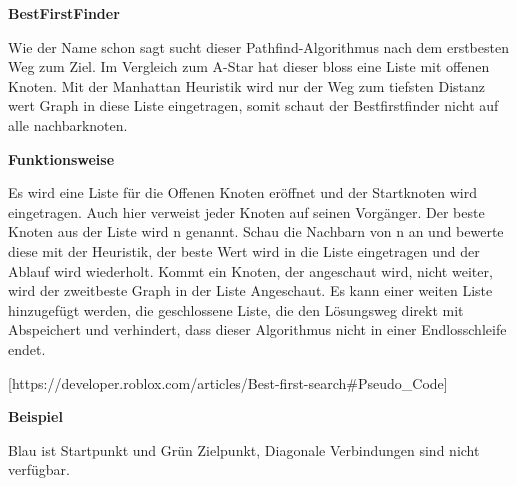 \textbf{BestFirstFinder}

Wie der Name schon sagt sucht dieser Pathfind-Algorithmus nach dem
erstbesten Weg zum Ziel. Im Vergleich zum A-Star hat dieser bloss eine
Liste mit offenen Knoten. Mit der Manhattan Heuristik wird nur der Weg
zum tiefsten Distanz wert Graph in diese Liste eingetragen, somit schaut
der Bestfirstfinder nicht auf alle nachbarknoten.

\textbf{Funktionsweise}

Es wird eine Liste für die Offenen Knoten eröffnet und der Startknoten
wird eingetragen. Auch hier verweist jeder Knoten auf seinen Vorgänger.
Der beste Knoten aus der Liste wird n genannt. Schau die Nachbarn von n
an und bewerte diese mit der Heuristik, der beste Wert wird in die Liste
eingetragen und der Ablauf wird wiederholt. Kommt ein Knoten, der
angeschaut wird, nicht weiter, wird der zweitbeste Graph in der Liste
Angeschaut. Es kann einer weiten Liste hinzugefügt werden, die
geschlossene Liste, die den Lösungsweg direkt mit Abspeichert und
verhindert, dass dieser Algorithmus nicht in einer Endlosschleife endet.

{[}https://developer.roblox.com/articles/Best-first-search\#Pseudo\_Code{]}

\textbf{Beispiel}

Blau ist Startpunkt und Grün Zielpunkt, Diagonale Verbindungen sind
nicht verfügbar.

